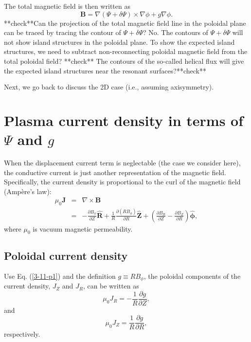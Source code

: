 \documentclass{llncs}
\newcommand{\tmmathbf}[1]{\ensuremath{\boldsymbol{#1}}}
\begin{document}
The total magnetic field is then written as
\begin{equation}
  \mathbf{B}= \nabla (\Psi + \delta \Psi) \times \nabla \phi + g \nabla \phi .
\end{equation}
**check**Can the projection of the total magnetic field line in the poloidal
plane can be traced by tracing the contour of $\Psi + \delta \Psi$? No. The
contours of $\Psi + \delta \Psi$ will not show island structures in the
poloidal plane. To show the expected island structures, we need to subtract
non-reconnecting poloidal magnetic field from the total poloidal field?
**check** The contours of the so-called helical flux will give the expected
island structures near the resonant surfaces?**check**

Next, we go back to discuss the 2D case (i.e., assuming axisymmetry).

\section{Plasma current density in terms of $\Psi$ and $g$}

When the displacement current term is neglectable (the case we consider here),
the conductive current is just another representation of the magnetic field.
Specifically, the current density is proportional to the curl of the magnetic
field (Amp{\`e}re's law):
\begin{eqnarray}
  \mu_0 \mathbf{J} & = & \nabla \times \mathbf{B} \nonumber\\
  & = & - \frac{\partial B_{\phi}}{\partial Z} \hat{\mathbf{R}} + \frac{1}{R}
  \frac{\partial (R B_{\phi})}{\partial R} \hat{\mathbf{Z}} + \left(
  \frac{\partial B_R}{\partial Z} - \frac{\partial B_Z}{\partial R} \right)
  \hat{\tmmathbf{\phi}},  \label{3-11-p1}
\end{eqnarray}
where $\mu_0$ is vacuum magnetic permeability.

\subsection{Poloidal current density}

Use Eq. (\ref{3-11-p1}) and the definition $g \equiv R B_{\phi}$, the poloidal
components of the current density, $J_Z$ and $J_R$, can be written as
\begin{equation}
  \label{5-2-a2} \mu_0 J_R = - \frac{1}{R} \frac{\partial g}{\partial Z},
\end{equation}
and
\begin{equation}
  \label{5-2-a1} \mu_0 J_Z = \frac{1}{R} \frac{\partial g}{\partial R},
\end{equation}
respectively.
\end{document}
